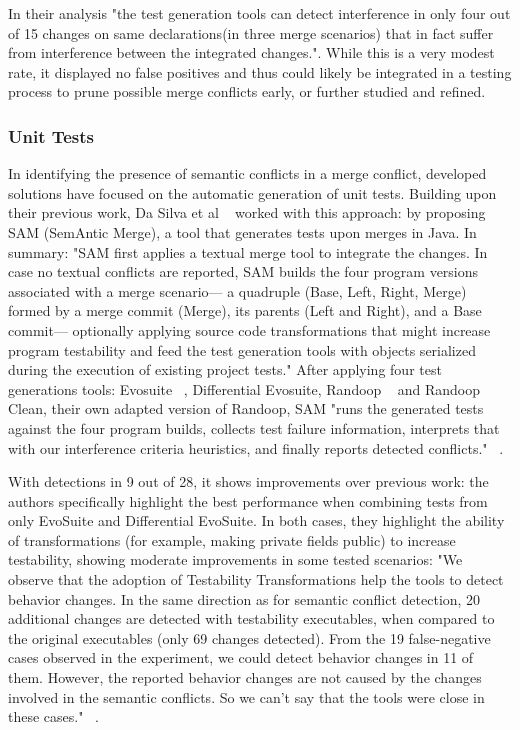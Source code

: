 In their analysis "the test generation tools can detect interference in only four out of 15 changes on same declarations(in three merge scenarios) that in fact suffer from interference between the integrated changes.". While this is a very modest rate, it displayed no false positives and thus could likely be integrated in a testing process to prune possible merge conflicts early, or further studied and refined.



\subsubsection{Unit Tests}

In identifying the presence of semantic conflicts in a merge conflict, developed solutions have focused on the automatic generation of unit tests. Building upon their previous work, Da Silva et al ~\citep{kn:leuson2} worked with this approach: by proposing SAM (SemAntic Merge), a tool that generates tests upon merges in Java. In summary: "SAM first applies a textual merge tool to integrate the changes. In case no textual conflicts are reported, SAM builds the four program versions
associated with a merge scenario— a quadruple (Base, Left, Right, Merge)
formed by a merge commit (Merge), its parents (Left and Right), and a Base
commit— optionally applying source code transformations that might increase
program testability and feed the test generation tools with objects serialized
during the execution of existing project tests." After applying four test generations tools: Evosuite ~\citep{kn:evosuite}, Differential Evosuite, Randoop ~\citep{kn:randoop} and Randoop Clean, their own adapted version of Randoop, SAM "runs the generated tests against the four program builds, collects test failure information, interprets
that with our interference criteria heuristics, and finally reports detected
conflicts." ~\citep{kn:leuson2}.

With detections in 9 out of 28, it shows improvements over previous work: the authors specifically highlight the best performance when combining tests from only EvoSuite and Differential EvoSuite. In both cases, they highlight the ability of transformations (for example, making private fields public) to increase testability, showing moderate improvements in some tested scenarios: "We observe that the adoption of Testability Transformations help the tools
to detect behavior changes. In the same direction as for semantic conflict
detection, 20 additional changes are detected with testability executables,
when compared to the original executables (only 69 changes detected). From
the 19 false-negative cases observed in the experiment, we could detect
behavior changes in 11 of them. However, the reported behavior changes are
not caused by the changes involved in the semantic conflicts. So we can’t say
that the tools were close in these cases."  ~\citep{kn:leuson2}.


